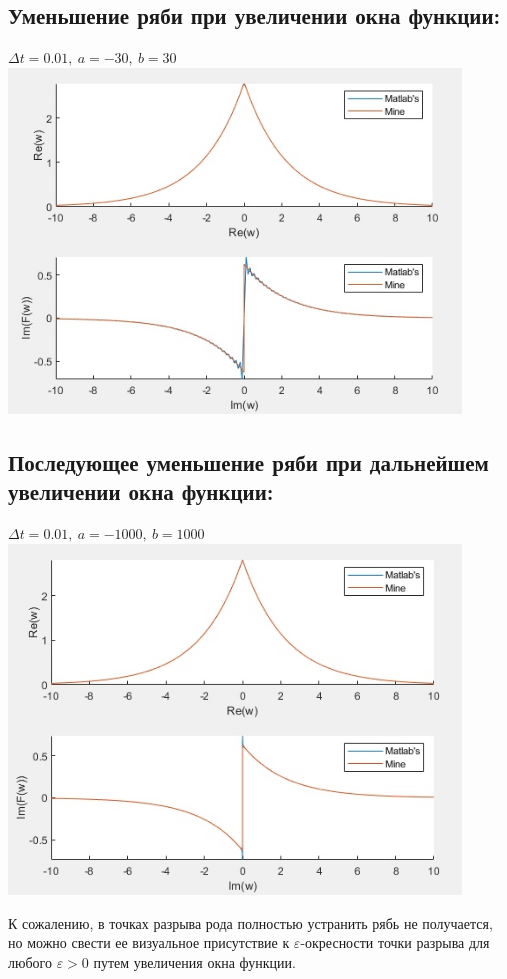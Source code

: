 \documentclass{article}
\newcommand{\RNumb}[1]{\uppercase\expandafter{\romannumeral #1\relax}}
\begin{document}
{\large\subsection{Уменьшение ряби при увеличении окна функции:}}
\begin{center}
  $\Delta t = 0.01,\ a = -30,\ b = 30$
  \includegraphics[width = 12cm, height 12cm]{dribble_2.jpg}
\end{center}

{\large\subsection{Последующее уменьшение ряби при дальнейшем увеличении окна функции:}}
\begin{center}
  $\Delta t = 0.01,\ a = -1000,\ b = 1000$
  \includegraphics[width = 12cm, height 12cm]{dribble_3.jpg}
\end{center}
\noindent К сожалению, в точках разрыва \RNumb2 рода полностью устранить рябь не получается, но можно свести ее визуальное присутствие к $\varepsilon$-окресности точки разрыва для любого $\varepsilon > 0$ путем увеличения окна функции.
\end{document}
